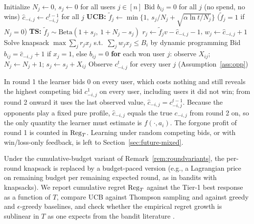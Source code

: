 \documentclass{article}
\theoremstyle{definition}
\theoremstyle{remark}
\begin{document}
\begin{algorithm}[h]
\caption{Budget-aware optimistic/Thompson bidding for advertiser $a_i$ (Tier 2)}
\label{alg:learner}
\begin{algorithmic}[1]
\State Initialize $N_j\gets0$, $s_j\gets0$ for all users $j\in[n]$
    \State Bid $b_{ij}=0$ for all $j$ (no spend, no wins)
  \Else
    \State $\hat c_{-i,j}\gets c^{t-1}_{-i,j}$ for all $j$ 
      \State \textbf{UCB:} $\tilde f_j\gets \min\{1,\ s_j/N_j+\sqrt{\alpha\ln t/N_j}\}$ ($\tilde f_j=1$ if $N_j=0$)
      \State \textbf{TS:} $\tilde f_j\sim\mathrm{Beta}(1+s_j,\ 1+N_j-s_j)$
      \State $r_j\gets\tilde f_j v-\hat c_{-i,j}-1$, \quad $w_j\gets \hat c_{-i,j}+1$
    \EndFor
    \State Solve knapsack $\max\sum_j r_jx_j$ s.t.\ $\sum_j w_jx_j\le B_i$ by dynamic programming
    \State Bid $b_{ij}=\hat c_{-i,j}+1$ if $x_j=1$, else $b_{ij}=0$
    \State \textbf{for} each won user $j$: observe $X_{ij}$; $N_j\gets N_j+1$; $s_j\gets s_j+X_{ij}$
  \EndIf
  \State Observe $c^t_{-i,j}$ for every user $j$ (Assumption~\ref{ass:opp})
\EndFor
\end{algorithmic}
\end{algorithm}

In round 1 the learner bids $0$ on every user, which costs nothing and still reveals the highest competing bid $c^1_{-i,j}$ on every user, including users it did not win; from round 2 onward it uses the last observed value, $\hat c_{-i,j}=c^{t-1}_{-i,j}$. Because the opponents play a fixed pure profile, $\hat c_{-i,j}$ equals the true $c_{-i,j}$ from round 2 on, so the only quantity the learner must estimate is $f(\cdot,a_i)$. The forgone profit of round 1 is counted in $\mathrm{Reg}_T$. Learning under random competing bids, or with win/loss-only feedback, is left to Section~\ref{sec:future-mixed}.

Under the cumulative-budget variant of Remark~\ref{rem:roundvariants}, the per-round knapsack is replaced by a budget-paced version (e.g., a Lagrangian price on remaining budget per remaining expected round, as in bandits with knapsacks). We report cumulative regret $\mathrm{Reg}_T$ against the Tier-1 best response as a function of $T$, compare UCB against Thompson sampling and against greedy and $\epsilon$-greedy baselines, and check whether the empirical regret growth is sublinear in $T$ as one expects from the bandit literature \citep{auer2002finite,agrawal2012analysis}.
\end{document}
